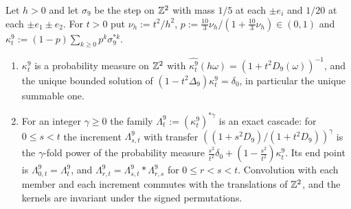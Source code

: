 \begin{proposition}
\label{prop:nine-point-family}

Let $h > 0$ and let $\sigma_9$ be the step on $\mathbb{Z}^2$ with mass $1/5$ at each $\pm e_i$ and $1/20$ at
each $\pm e_1 \pm e_2$. For $t > 0$ put $\nu_h := t^2/h^2$,
$p := \tfrac{10}{3}\nu_h/(1 + \tfrac{10}{3}\nu_h) \in (0,1)$ and
$\kappa^9_t := (1-p)\sum_{k \ge 0}p^k\sigma_9^{*k}$.
\begin{enumerate}
\item $\kappa^9_t$ is a probability measure on $\mathbb{Z}^2$ with
$\widehat{\kappa^9_t}(h\omega) = (1 + t^2D_9(\omega))^{-1}$, and the unique bounded solution of
$(1 - t^2\Delta_9)\kappa^9_t = \delta_0$, in particular the unique summable one.
\item For an integer $\gamma \ge 0$ the family $\Lambda^9_t := (\kappa^9_t)^{*\gamma}$ is an exact
cascade: for $0 \le s < t$ the increment $\Lambda^9_{s,t}$ with transfer
$((1 + s^2D_9)/(1 + t^2D_9))^\gamma$ is the $\gamma$-fold power of the probability measure
$\tfrac{s^2}{t^2}\delta_0 + (1 - \tfrac{s^2}{t^2})\kappa^9_t$. Its end point is
$\Lambda^9_{0,t} = \Lambda^9_t$, and $\Lambda^9_{r,t} = \Lambda^9_{s,t} * \Lambda^9_{r,s}$ for
$0 \le r < s < t$. Convolution with each member
and each increment commutes with the translations of $\mathbb{Z}^2$, and the kernels are invariant under
the signed permutations.
\end{enumerate}
\end{proposition}


